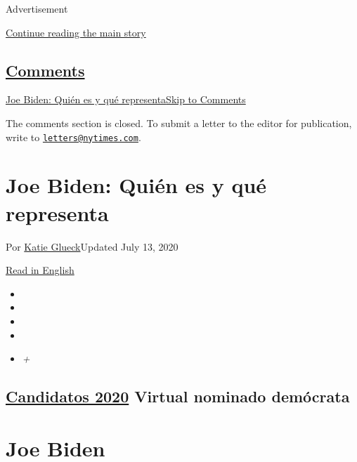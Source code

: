 Advertisement

\protect\hyperlink{after-top}{Continue reading the main story}

\hypertarget{comments}{%
\subsection{\texorpdfstring{\protect\hyperlink{commentsContainer}{Comments}}{Comments}}\label{comments}}

\href{}{Joe Biden: Quién es y qué representa}\href{}{Skip to Comments}

The comments section is closed. To submit a letter to the editor for
publication, write to
\href{mailto:letters@nytimes.com}{\nolinkurl{letters@nytimes.com}}.

\hypertarget{joe-biden-quiuxe9n-es-y-quuxe9-representa}{%
\section{Joe Biden: Quién es y qué
representa}\label{joe-biden-quiuxe9n-es-y-quuxe9-representa}}

Por \href{https://www.nytimes.com/by/katie-glueck}{Katie Glueck}Updated
July 13, 2020

\href{https://www.nytimes.com/interactive/2020/us/elections/joe-biden.html}{Read
in English}

\begin{itemize}
\item
\item
\item
\item
\item
  \emph{+}
\end{itemize}

\hypertarget{candidatos-2020--virtual-nominado-demuxf3crata-}{%
\subsection{\texorpdfstring{\href{https://www.nytimes.com/interactive/2019/us/politics/2020-presidential-candidates.html}{Candidatos
2020} Virtual nominado demócrata
}{Candidatos 2020  Virtual nominado demócrata }}\label{candidatos-2020--virtual-nominado-demuxf3crata-}}

\hypertarget{joe-biden}{%
\section{Joe Biden}\label{joe-biden}}


